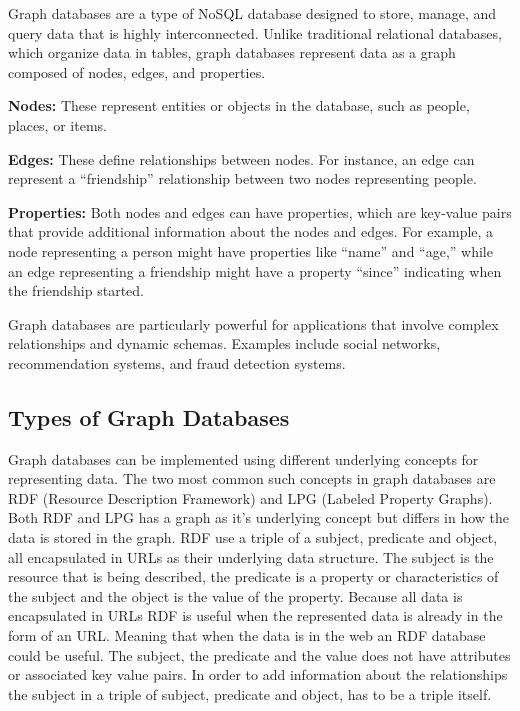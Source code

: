 Graph databases are a type of NoSQL database designed to store, manage, and query data that is highly interconnected. Unlike traditional relational databases, which organize data in tables, graph databases represent data as a graph composed of nodes, edges, and properties.

\textbf{Nodes:} These represent entities or objects in the database, such as people, places, or items.

\textbf{Edges:} These define relationships between nodes. For instance, an edge can represent a ``friendship'' relationship between two nodes representing people.

\textbf{Properties:} Both nodes and edges can have properties, which are key-value pairs that provide additional information about the nodes and edges. For example, a node representing a person might have properties like ``name'' and ``age,'' while an edge representing a friendship might have a property ``since'' indicating when the friendship started.

Graph databases are particularly powerful for applications that involve complex relationships and dynamic schemas. Examples include social networks, recommendation systems, and fraud detection systems.

\subsection{Types of Graph Databases}

Graph databases can be implemented using different underlying concepts for representing data. The two most common such concepts in graph databases are RDF (Resource Description Framework) and LPG (Labeled Property Graphs). Both RDF and LPG has a graph as it's underlying concept but differs in how the data is stored in the graph. RDF use a triple of a subject, predicate and object, all encapsulated in URLs as their underlying data structure. The subject is the resource that is being described, the predicate is a property or characteristics of the subject and the object is the value of the property. Because all data is encapsulated in URLs RDF is useful when the represented data is already in the form of an URL. Meaning that when the data is in the web an RDF database could be useful. The subject, the predicate and the value does not have attributes or associated key value pairs. In order to add information about the relationships the subject in a triple of subject, predicate and object, has to be a triple itself. 

